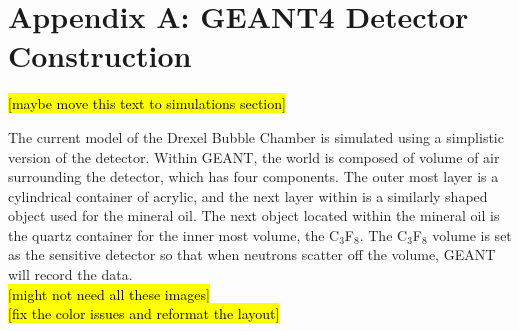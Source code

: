 \documentclass[%
12pt,
twoside,
reprint,
amsmath,amssymb,
aps,
]{article}
\begin{document}
	\section*{Appendix A: GEANT4 Detector Construction}
	\noindent \hl{[maybe move this text to simulations section]}
	\par The current model of the Drexel Bubble Chamber is simulated using a simplistic version of the detector. Within GEANT, the world is composed of volume of air surrounding the detector, which has four components. The outer most layer is a cylindrical container of acrylic, and the next layer within is a similarly shaped object used for the mineral oil. The next object located within the mineral oil is the quartz container for the inner most volume, the C$_{3}$F$_{8}$. The C$_{3}$F$_{8}$ volume is set as the sensitive detector so that when neutrons scatter off the volume, GEANT will record the data. \\
	\hl{[might not need all these images]} \\
	\hl{[fix the color issues and reformat the layout]}
\end{document}
